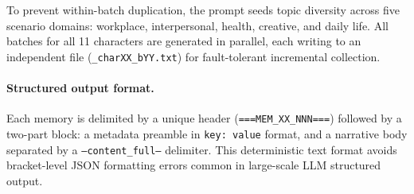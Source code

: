 To prevent within-batch duplication, the prompt seeds topic diversity across five scenario domains: workplace, interpersonal, health, creative, and daily life. All batches for all 11 characters are generated in parallel, each writing to an independent file (\texttt{\_charXX\_bYY.txt}) for fault-tolerant incremental collection.

\paragraph{Structured output format.}
Each memory is delimited by a unique header (\texttt{===MEM\_XX\_NNN===}) followed by a two-part block: a metadata preamble in \texttt{key: value} format, and a narrative body separated by a \texttt{---content\_full---} delimiter. This deterministic text format avoids bracket-level JSON formatting errors common in large-scale LLM structured output.

